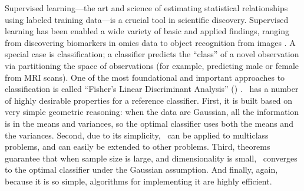 \documentclass[10pt]{article}
\begin{document}
\vspace{15pt}

\linenumbers












Supervised learning---the art and science of estimating statistical relationships using labeled training data---is a crucial tool in scientific discovery.  Supervised learning has been enabled a wide variety of basic and applied findings, ranging from discovering biomarkers in omics data \cite{Vogelstein2014a} to object recognition from images \cite{Krizhevsky2012}.
A special case is classification; a classifier predicts the ``class'' of a novel observation via partitioning the space of observations (for example, predicting male  or female from MRI scans). One of the most foundational and important approaches to classification is called ``Fisher's Linear Discriminant Analysis'' (\Lda) \cite{Fisher1925a}. 
\Lda~has a number of highly desirable properties for a reference classifier.  
First, it is built based on very simple geometric reasoning: when the data are Gaussian, all the information is in the means and variances, so the optimal classifier uses both the means and the variances.  
Second, due to its simplicity, \Lda~can be applied to multiclass problems, and can easily be extended to other problems.
Third, theorems guarantee that when sample size is large, and dimensionality is small, \Lda~converges to the optimal classifier under the Gaussian assumption.
And finally, again, because it is so simple, algorithms for implementing it are highly efficient.
\end{document}
